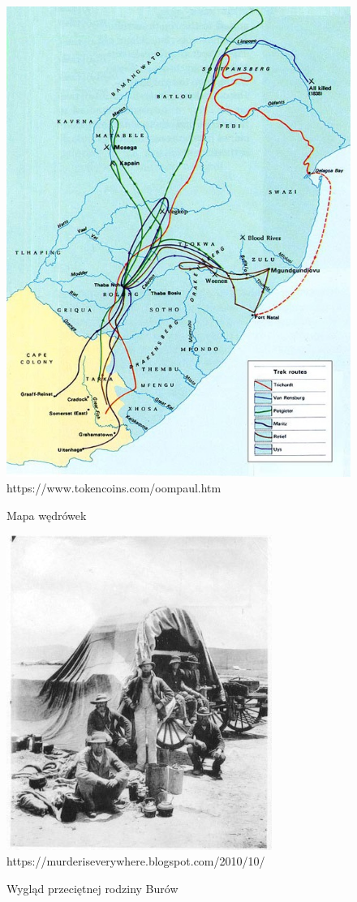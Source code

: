 \documentclass[12pt, twocolumn]{article}
\begin{document}
\begin{figure}[h]%
\caption{Mapa wędrówek}
\includegraphics[scale=.8]{mapa.jpg}
\tiny{https://www.tokencoins.com/oompaul.htm}
\label{fig1}
\end{figure}

\onecolumn
\begin{figure}[t]%
\caption{Wygląd przeciętnej rodziny Burów}
\includegraphics[scale=.6]{Burowie.jpg}
\tiny{https://murderiseverywhere.blogspot.com/2010/10/}
\label{fig2}
\end{figure}
\end{document}
